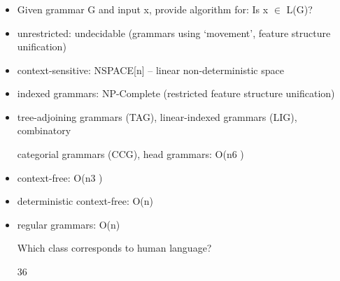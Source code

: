 \documentclass[compress,color=usenames]{beamer}
\begin{document}
\begin{frame}
\frametitle{}

\begin{itemize}
\item

Given grammar G and input x, provide algorithm for: Is x $\in$ L(G)?


\item unrestricted: undecidable (grammars using {`}movement', feature structure uniﬁcation)


\item context-sensitive: NSPACE[n] -- linear non-deterministic space


\item indexed grammars: NP-Complete (restricted feature structure uniﬁcation)


\item tree-adjoining grammars (TAG), linear-indexed grammars (LIG), combinatory


categorial grammars (CCG), head grammars: O(n6 )


\item context-free: O(n3 )


\item deterministic context-free: O(n)


\item regular grammars: O(n)





Which class corresponds to human language?


36




\end{itemize}

\end{frame}
\end{document}
